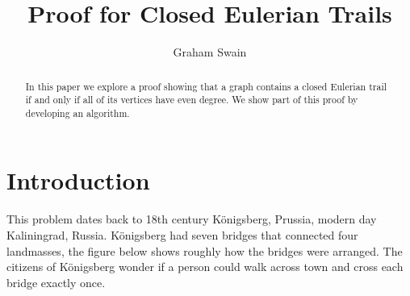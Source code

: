 \documentclass[10pt]{amsart}
\begin{document}
\parskip10pt
\parindent12pt
\baselineskip16pt






\def\G{\widetilde{G}}
\def\B{\widetilde{B}}
\def\T{\widetilde{T}}
\def\C{\mathbb{C}}
\def\A{\mathbb{A}}
\def\Z{\mathbb{Z}}
\def\R{\mathbb{R}}
\def\Q{\mathbb{Q}}
\def\N{\mathbb{N}}
\def\C{\mathbb{C}}
\def\F{\mathbb{F}}
\def\I{\mathbb{I}}
\def\H{\mathcal{H}}
\def\e{\varepsilon}
\def\s{\underline s}
\def\z{\zeta }
\def\vp{\varpi }
\def\O{\mathcal O}
\def\v{\upsilon }
\def\U{\Upsilon }
\def\p{\wp }
\def\p{\mathfrak{p}}
\def\B{\mathfrak{B}}

\newtheorem{theorem}{Theorem}%
\newtheorem{lemma}[theorem]{Lemma}


\title{Proof for Closed Eulerian Trails}

\author{Graham Swain}




\begin{abstract}
In this paper we explore a proof showing that a graph contains a closed Eulerian trail if and only if
all of its vertices have even degree. We show part of this proof by developing an algorithm.
\end{abstract}

\maketitle





\section{Introduction}

This problem dates back to 18th century K\"{o}nigsberg, Prussia, modern day Kaliningrad, Russia. K\"{o}nigsberg had seven
bridges that connected four landmasses, the figure below shows roughly how the bridges were arranged. The citizens of
K\"{o}nigsberg wonder if a person could walk across town and cross each bridge exactly once.
\end{document}

